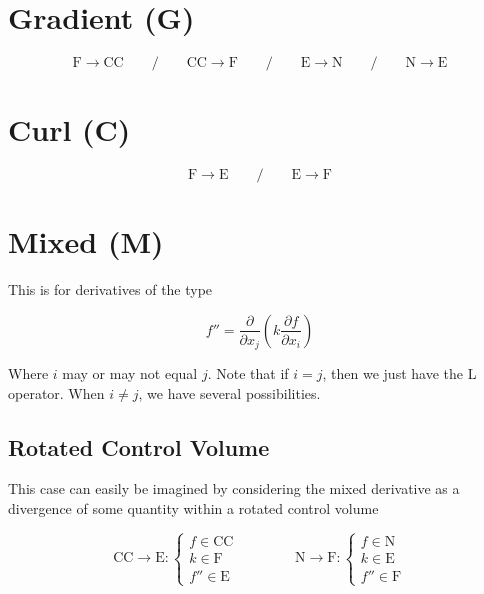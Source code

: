 \documentclass[11pt]{article}
\begin{document}
\section{Gradient (G)}

\begin{equation}
	\text{F} \rightarrow \text{CC}
	\qquad / \qquad 
	\text{CC} \rightarrow \text{F}
	\qquad / \qquad 
	\text{E} \rightarrow \text{N}
	\qquad / \qquad 
	\text{N} \rightarrow \text{E}
\end{equation}

\section{Curl (C)}

\begin{equation}
	\text{F} \rightarrow \text{E}
	\qquad / \qquad 
	\text{E} \rightarrow \text{F}
\end{equation}

\section{Mixed (M)}

This is for derivatives of the type

\begin{equation}
	f''
	=
	\frac{\partial}{\partial x_j}
	\left(
	k
	\frac{\partial f}{\partial x_i}
	\right)
\end{equation}

Where $i$ may or may not equal $j$. Note that if $i=j$, then we just have the L operator. When $i\ne j$, we have several possibilities.

\subsection{Rotated Control Volume}
This case can easily be imagined by considering the mixed derivative as a divergence of some quantity within a rotated control volume

\begin{equation}
	\text{CC} \rightarrow \text{E} : 
	\begin{cases}
	f \in \text{CC} \\
	k \in \text{F} \\
	f'' \in \text{E}
	\end{cases}
	\qquad \qquad
	\text{N} \rightarrow \text{F} : 
	\begin{cases}
	f \in \text{N} \\
	k \in \text{E} \\
	f'' \in \text{F}
	\end{cases}
\end{equation}
\end{document}
